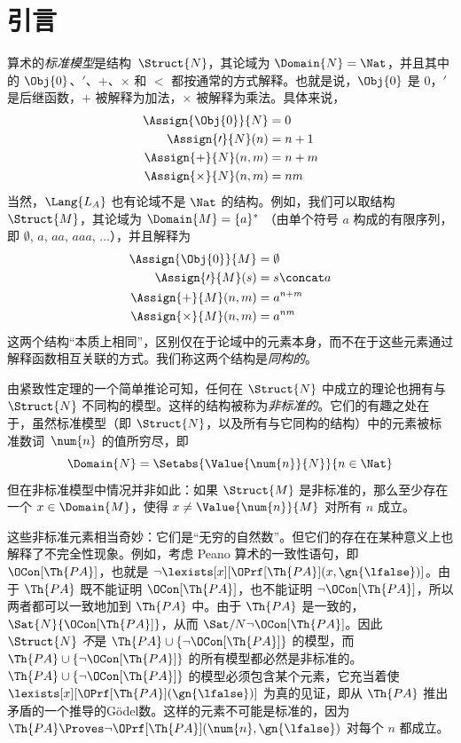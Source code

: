 \documentclass[../../../include/open-logic-section]{subfiles}
\begin{document}
\section{引言}

算术的\emph{标准模型}是结构~$\Struct{N}$，其论域为 $\Domain{N} = \Nat$，并且其中的 $\Obj{0}$、$\prime$、$+$、$\times$ 和 $<$ 都按通常的方式解释。也就是说，$\Obj{0}$ 是 $0$，$\prime$ 是后继函数，$+$ 被解释为加法，$\times$ 被解释为乘法。具体来说，
\begin{align*}
  \Assign{\Obj{0}}{N} & = 0\\
  \Assign{\prime}{N}(n) & = n + 1\\
  \Assign{+}{N}(n, m) & = n + m\\
  \Assign{\times}{N}(n, m) & = nm
\end{align*}
当然，$\Lang{L_A}$ 也有论域不是 $\Nat$ 的结构。例如，我们可以取结构 $\Struct{M}$，其论域为
$\Domain{M} = \{a\}^*$ （由单个符号 $a$ 构成的有限序列，即 $\emptyset$, $a$, $aa$, $aaa$, $\dots$），并且解释为
\begin{align*}
  \Assign{\Obj{0}}{M} & = \emptyset\\
  \Assign{\prime}{M}(s) & = s \concat a\\
  \Assign{+}{M}(n, m) & = a^{n + m}\\
  \Assign{\times}{M}(n, m) & = a^{nm}
\end{align*}
这两个结构“本质上相同”，区别仅在于论域中的元素本身，而不在于这些元素通过解释函数相互关联的方式。我们称这两个结构是\emph{同构的}。

由紧致性定理的一个简单推论可知，任何在 $\Struct{N}$ 中成立的理论也拥有与 $\Struct{N}$ 不同构的模型。这样的结构被称为\emph{非标准的}。它们的有趣之处在于，虽然标准模型（即 $\Struct{N}$，以及所有与它同构的结构）中的元素被标准数词~$\num{n}$ 的值所穷尽，即
\[
\Domain{N} = \Setabs{\Value{\num{n}}{N}}{n \in \Nat}
\]
但在非标准模型中情况并非如此：如果 $\Struct{M}$ 是非标准的，那么至少存在一个 $x \in \Domain{M}$，使得
$x \neq \Value{\num{n}}{M}$ 对所有 $n$ 成立。

这些非标准元素相当奇妙：它们是“无穷的自然数”。但它们的存在在某种意义上也解释了不完全性现象。例如，考虑 Peano 算术的一致性语句，即 $\OCon[\Th{PA}]$，也就是 $\lnot
\lexists[x][\OPrf[\Th{PA}](x, \gn{\lfalse})]$。由于 $\Th{PA}$ 既不能证明 $\OCon[\Th{PA}]$，也不能证明 $\lnot \OCon[\Th{PA}]$，所以两者都可以一致地加到 $\Th{PA}$ 中。由于 $\Th{PA}$ 是一致的，
$\Sat{N}{\OCon[\Th{PA}]}$，从而 $\Sat/{N}{\lnot
  \OCon[\Th{PA}]}$。因此 $\Struct{N}$ \emph{不}是 $\Th{PA}
\cup \{\lnot \OCon[\Th{PA}]\}$ 的模型，而 $\Th{PA}
\cup \{\lnot \OCon[\Th{PA}]\}$ 的所有模型都必然是非标准的。$\Th{PA} \cup \{\lnot \OCon[\Th{PA}]\}$ 的模型必须包含某个元素，它充当着使 $\lexists[x][\OPrf[\Th{PA}](\gn{\lfalse})]$ 为真的见证，即从 $\Th{PA}$ 推出矛盾的一个推导的Gödel数。这样的元素不可能是标准的，因为 $\Th{PA} \Proves \lnot
\OPrf[\Th{PA}](\num{n}, \gn{\lfalse})$ 对每个 $n$ 都成立。
\end{document}
